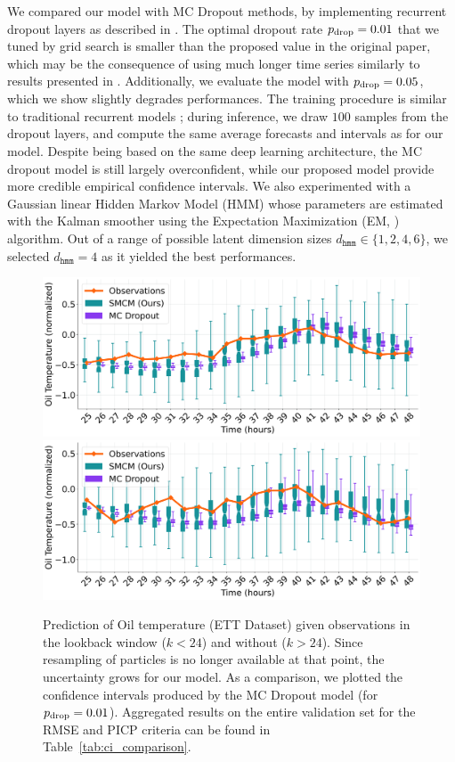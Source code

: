 \documentclass[conference]{IEEEtran}
\begin{document}
We compared our model with MC Dropout methods, by implementing recurrent dropout layers as described in \cite{Gal2016NIPS}.
The optimal dropout rate $p_\textnormal{drop}=0.01$ that we tuned by grid search is smaller than the proposed value in the original paper, which may be the consequence of using much longer time series similarly to results presented in \cite{Zhu2017DeepAC}.
Additionally, we evaluate the model with $p_\textnormal{drop}=0.05$, which we show slightly degrades performances.
The training procedure is similar to traditional recurrent models ; during inference, we draw $100$ samples from the dropout layers, and compute the same average forecasts and  intervals as for our model.
Despite being based on the same deep learning architecture, the MC dropout model is still largely overconfident, while our proposed model provide more credible empirical confidence intervals.
We also experimented with a Gaussian linear Hidden Markov Model (HMM) whose parameters are estimated with the Kalman smoother using the Expectation Maximization (EM, \cite{Dempster77EM}) algorithm.
Out of a range of possible latent dimension sizes $d_{\texttt{hmm}} \in \{1, 2, 4, 6\}$, we selected $d_{\texttt{hmm}}=4$ as it yielded the best performances.

\begin{figure}[htpb]
	\centering
	\caption{Prediction of Oil temperature (ETT Dataset) given observations in the lookback window ($k<24$) and without ($k>24$).
		Since resampling of particles is no longer available at that point, the uncertainty grows for our model.
		As a comparison, we plotted the confidence intervals produced by the MC Dropout model (for $p_\textnormal{drop}=0.01$).
		Aggregated results on the entire validation set for the RMSE and PICP criteria can be found in Table~\ref{tab:ci_comparison}.}
	\includegraphics[width=\linewidth]{filter_kp24_ett.png}
	\includegraphics[width=\linewidth]{filter_kp24_ett_2.png}
	\label{fig:filter_k+24}
\end{figure}
\end{document}
